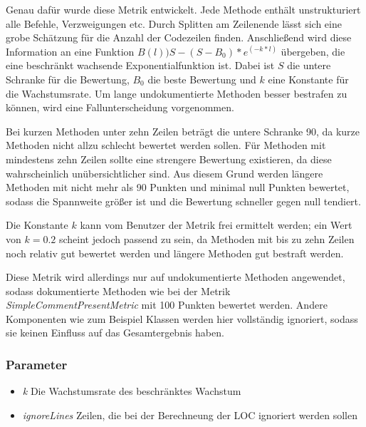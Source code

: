  Genau dafür wurde diese Metrik entwickelt. Jede Methode enthält unstrukturiert alle Befehle, Verzweigungen etc. Durch Splitten am Zeilenende lässt sich eine grobe Schätzung für die Anzahl der Codezeilen finden. Anschließend wird diese Information  an eine Funktion $B(l))S-(S-B_0)*e^(-k*l)$ übergeben, die eine beschränkt wachsende Exponentialfunktion ist. Dabei ist $S$ die untere Schranke für die Bewertung, $B_0$ die beste Bewertung und $k$ eine Konstante für die Wachstumsrate. Um lange undokumentierte Methoden besser bestrafen zu können, wird eine Fallunterscheidung vorgenommen.
 
 Bei kurzen Methoden unter zehn Zeilen beträgt die untere Schranke 90, da kurze Methoden nicht allzu schlecht bewertet werden sollen. Für Methoden mit mindestens zehn Zeilen sollte eine strengere Bewertung existieren, da diese wahrscheinlich unübersichtlicher sind. Aus diesem Grund werden längere Methoden mit nicht mehr als 90 Punkten und minimal null Punkten bewertet, sodass die Spannweite größer ist und die Bewertung schneller gegen null tendiert.
 
 Die Konstante $k$ kann vom Benutzer der Metrik frei ermittelt werden; ein Wert von $k=0.2$ scheint jedoch passend zu sein, da Methoden mit bis zu zehn Zeilen noch relativ gut bewertet werden und längere Methoden gut bestraft werden.
 
 Diese Metrik wird allerdings nur auf undokumentierte Methoden angewendet, sodass dokumentierte Methoden wie bei der Metrik \textit{SimpleCommentPresentMetric} mit 100 Punkten bewertet werden. Andere Komponenten wie zum Beispiel Klassen werden hier vollständig ignoriert, sodass sie keinen Einfluss auf das Gesamtergebnis haben.
 \subsubsection{Parameter}
 \begin{itemize}
     \item \textit{k} Die Wachstumsrate des beschränktes Wachstum
     \item \textit{ignoreLines} Zeilen, die bei der Berechneung der \ac{LOC} ignoriert werden sollen
 \end{itemize}
     

